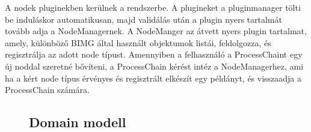 \documentclass[a4paper,12pt,oneside]{report}
\begin{document}
A nodek pluginekben kerülnek a rendszerbe. A plugineket a pluginmanager tölti be induláskor automatikusan, majd validálás után a plugin nyers tartalmát tovább adja a NodeManagernek. A NodeManger az átvett nyers plugin tartalmat, amely, különböző BIMG által használt objektumok listái, feldolgozza, és regisztrálja az adott node típust. Amennyiben a felhasználó a ProcessChaint egy új noddal szeretné bővíteni, a ProcessChain kérést intéz a NodeManagerhez, ami ha a kért node típus érvényes és regisztrált elkészít egy példányt, és visszaadja a ProcessChain számára.

\begin{landscape}
\begin{figure}[h]
  \subsection{Domain modell}

\end{figure}
\end{landscape}
\end{document}
